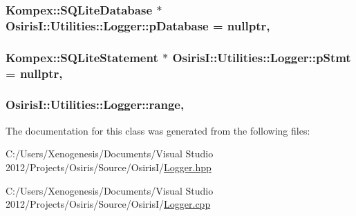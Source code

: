 \hypertarget{class_osiris_i_1_1_utilities_1_1_logger_a06244b9bf8a24622c53d7cbb750a95da}{
\subsubsection[{p\-Database}]{\setlength{\rightskip}{0pt plus 5cm}Kompex\-::\-S\-Q\-Lite\-Database $\ast$ Osiris\-I\-::\-Utilities\-::\-Logger\-::p\-Database = nullptr\hspace{0.3cm}{\ttfamily [static]}, {\ttfamily [protected]}}}\label{class_osiris_i_1_1_utilities_1_1_logger_a06244b9bf8a24622c53d7cbb750a95da}
\hypertarget{class_osiris_i_1_1_utilities_1_1_logger_a6d87ea6dd9afbe204cf4856b40240cbd}{
\subsubsection[{p\-Stmt}]{\setlength{\rightskip}{0pt plus 5cm}Kompex\-::\-S\-Q\-Lite\-Statement $\ast$ Osiris\-I\-::\-Utilities\-::\-Logger\-::p\-Stmt = nullptr\hspace{0.3cm}{\ttfamily [static]}, {\ttfamily [protected]}}}\label{class_osiris_i_1_1_utilities_1_1_logger_a6d87ea6dd9afbe204cf4856b40240cbd}
\hypertarget{class_osiris_i_1_1_utilities_1_1_logger_a86c1c8c26697c3bca4540ba83cfc48b5}{
\subsubsection[{range}]{ Osiris\-I\-::\-Utilities\-::\-Logger\-::range\hspace{0.3cm}{\ttfamily [static]}, {\ttfamily [protected]}}}\label{class_osiris_i_1_1_utilities_1_1_logger_a86c1c8c26697c3bca4540ba83cfc48b5}


The documentation for this class was generated from the following files\-:\begin{DoxyCompactItemize}
\item 
C\-:/\-Users/\-Xenogenesis/\-Documents/\-Visual Studio 2012/\-Projects/\-Osiris/\-Source/\-Osiris\-I/\hyperlink{_logger_8hpp}{Logger.\-hpp}\item 
C\-:/\-Users/\-Xenogenesis/\-Documents/\-Visual Studio 2012/\-Projects/\-Osiris/\-Source/\-Osiris\-I/\hyperlink{_logger_8cpp}{Logger.\-cpp}\end{DoxyCompactItemize}
